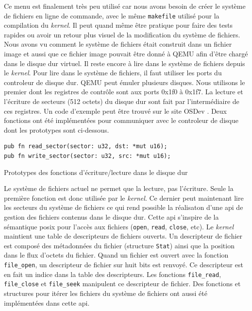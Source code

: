 Ce menu est finalement très peu utilisé car nous avons besoin de créer le système
de fichiers en ligne de commande, avec le même \texttt{makefile} utilisé
pour la compilation du \textit{kernel}. Il peut quand même être pratique pour faire
des tests rapides ou avoir un retour plus visuel de la modification
du système de fichiers. Nous avons vu comment le système de fichiers était construit
dans un fichier image et aussi que ce fichier image pouvait être donné à QEMU afin
d'être chargé dans le disque dur virtuel. Il reste encore à lire dans le système
de fichiers depuis le \textit{kernel}. Pour lire dans le système de fichiers, il
faut utiliser les ports du controleur de disque dur. QEMU peut émuler plusieurs
disques. Nous utilisons le premier dont les registres de contrôle sont aux ports
0x1f0 à 0x1f7. La lecture et l'écriture de secteurs (512 octets) du disque dur
sont fait par l'intermédiaire de ces registres. Un code d'exemple peut être trouvé
sur le site OSDev \cite{ref24}. Deux fonctions ont été implémentées pour communiquer
avec le controleur de disque dont les prototypes sont ci-dessous.

\begin{code}
\begin{verbatim}
pub fn read_sector(sector: u32, dst: *mut u16);
pub fn write_sector(sector: u32, src: *mut u16);
\end{verbatim}
\caption{Prototypes des fonctions d'écriture/lecture dans le disque dur}
\label{lst:fs:impl:rw}
\end{code} \bigbreak

Le système de fichiers actuel ne permet que la lecture, pas l'écriture.
Seule la première fonction est donc utilisée par le \textit{kernel}. Ce dernier
peut maintenant lire les secteurs du système de fichiers ce qui rend possible
la réalisaton d'une \acrshort{api} de gestion des fichiers contenus dans le disque dur.
Cette \acrshort{api} s'inspire de la sémantique \acrshort{posix} pour l'accès aux
fichiers (\texttt{open}, \texttt{read}, \texttt{close},
etc). Le \textit{kernel} maintient une table de descripteurs de fichiers ouverts.
Un descripteur de fichier est composé des métadonnées du fichier (structure
\texttt{Stat}) ainsi que la position dans le flux d'octets du fichier.
Quand un fichier est ouvert avec la fonction \texttt{file_open}, un descripteur
de fichier sur huit bits est renvoyé. Ce descripteur est en fait un indice dans
la table des descripteurs. Les fonctions \texttt{file_read},
\texttt{file_close} et \texttt{file_seek} manipulent
ce descripteur de fichier. Des fonctions et structures pour itérer les fichiers
du système de fichiers ont aussi été implémentées dans cette \acrshort{api}.